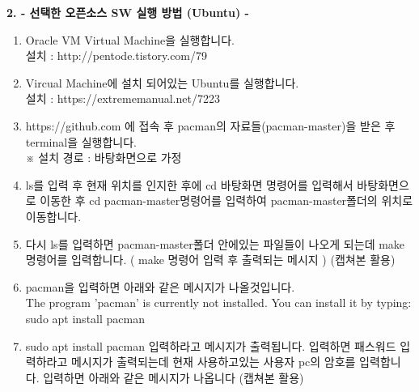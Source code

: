 \documentclass{article}
\begin{document}
\newpage
\textbf{2. - 선택한 오픈소스 SW 실행 방법 (Ubuntu) -}
\begin{enumerate}
\item Oracle VM Virtual Machine을 실행합니다. \\
설치 : http://pentode.tistory.com/79\\

\item Vircual Machine에 설치 되어있는 Ubuntu를 실행합니다. \\
설치 : https://extrememanual.net/7223\\

\item https://github.com 에 접속 후 pacman의 자료들(pacman-master)을 받은 후 terminal을 실행합니다. \\※ 설치 경로 : 바탕화면으로 가정\\
\item ls를 입력 후 현재 위치를 인지한 후에 cd 바탕화면 명령어를 입력해서 바탕화면으로 이동한 후 cd pacman-master명령어를 입력하여 pacman-master폴더의 위치로 이동합니다.\\
\item 다시 ls를 입력하면 pacman-master폴더 안에있는 파일들이 나오게 되는데 make 명령어를 입력합니다. ( make 명령어 입력 후 출력되는 메시지 ) (캡쳐본 활용)\\
\item pacman을 입력하면 아래와 같은 메시지가 나올것입니다. \\
The program 'pacman' is currently not installed. You can install it by typing: sudo apt install pacman\\
\item sudo apt install pacman 입력하라고 메시지가 출력됩니다. 입력하면 패스워드 입력하라고 메시지가 출력되는데 현재 사용하고있는 사용자 pc의 암호를 입력합니다. 입력하면 아래와 같은 메시지가 나옵니다 (캡쳐본 활용)
\end{enumerate}
\end{document}
